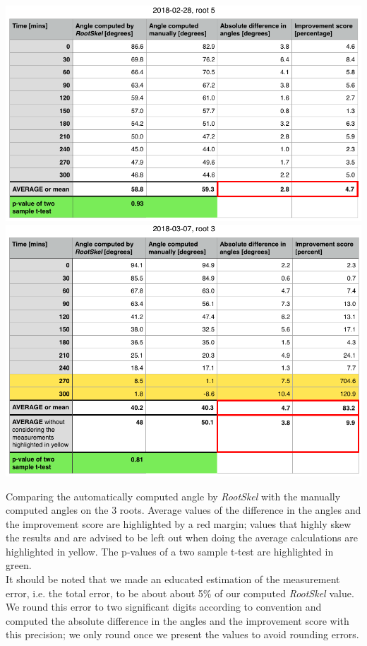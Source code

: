 \begin{table}[H]
	\centering
	\includegraphics[width=\textwidth]{../Figures/2018-02-28-stats-new.png}
	\includegraphics[width=\textwidth]{../Figures/2018-03-07-stats-new.png}
	\caption{Comparing the automatically computed angle by \textit{RootSkel} with the manually computed angles on the 3 roots. Average values of the difference in the angles and the improvement score are highlighted by a red margin; values that highly skew the results and are advised to be left out when doing the average calculations are highlighted in yellow.
	The p-values of a two sample t-test are highlighted in green.\\ 
	It should be noted that we made an educated estimation of the measurement error, i.e. the total error, to be about about 5\% of our computed \textit{RootSkel} value. We round this error to two significant digits according to convention and computed the absolute difference in the angles and the improvement score with this precision; we only round once we present the values to avoid rounding errors. }
	\label{table:resultTable}
\end{table}
